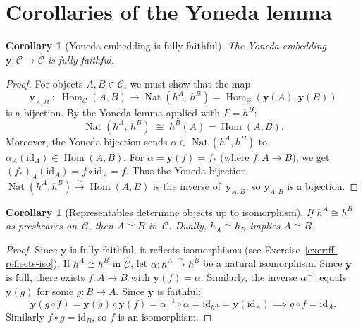 \documentclass[a4paper,12pt]{book}
\DeclareMathOperator{\Hom}{Hom}
\DeclareMathOperator{\Nat}{Nat}
\newcommand{\id}{\mathrm{id}}
\theoremstyle{definition}
\theoremstyle{plain}
\newtheorem{corollary}[definition]{Corollary}
\theoremstyle{remark}
\begin{document}
\section{Corollaries of the Yoneda lemma}\label{sec:yoneda-corollaries}

\begin{corollary}[Yoneda embedding is fully faithful]%
\label{cor:yoneda-ff}
The Yoneda embedding $\mathbf{y}\colon\mathcal{C}\to\widehat{\mathcal{C}}$
is fully faithful.
\end{corollary}

\begin{proof}
For objects $A,B\in\mathcal{C}$, we must show that the map
\[
    \mathbf{y}_{A,B} \;\colon\;
    \Hom_{\mathcal{C}}(A,B) \longrightarrow
    \Nat(h^A,\,h^B) = \Hom_{\widehat{\mathcal{C}}}(\mathbf{y}(A),\mathbf{y}(B))
\]
is a bijection.  By the Yoneda lemma applied with $F = h^B$:
\[
    \Nat(h^A,\,h^B) \;\cong\; h^B(A) = \Hom(A,B).
\]
Moreover, the Yoneda bijection sends $\alpha\in\Nat(h^A,h^B)$ to
$\alpha_A(\id_A)\in\Hom(A,B)$.  For $\alpha = \mathbf{y}(f) = f_*$
(where $f\colon A\to B$), we get $(f_*)_A(\id_A) = f\circ\id_A = f$.
Thus the Yoneda bijection $\Nat(h^A,h^B)\xrightarrow{\sim}\Hom(A,B)$
is the inverse of~$\mathbf{y}_{A,B}$, so $\mathbf{y}_{A,B}$ is
a bijection.
\end{proof}

\begin{corollary}[Representables determine objects up to isomorphism]%
\label{cor:representable-iso}
If $h^A \cong h^B$ as presheaves on~$\mathcal{C}$, then $A\cong B$
in~$\mathcal{C}$.  Dually, $h_A\cong h_B$ implies $A\cong B$.
\end{corollary}

\begin{proof}
Since $\mathbf{y}$ is fully faithful, it reflects isomorphisms
(see Exercise~\ref{exer:ff-reflects-iso}).
If $h^A\cong h^B$ in $\widehat{\mathcal{C}}$, let
$\alpha\colon h^A\xrightarrow{\sim} h^B$ be a natural isomorphism.
Since $\mathbf{y}$ is full, there exists $f\colon A\to B$ with
$\mathbf{y}(f)=\alpha$.  Similarly, the inverse $\alpha^{-1}$ equals
$\mathbf{y}(g)$ for some $g\colon B\to A$.  Since $\mathbf{y}$ is faithful:
\[
    \mathbf{y}(g\circ f) = \mathbf{y}(g)\circ\mathbf{y}(f)
    = \alpha^{-1}\circ\alpha = \id_{h^A} = \mathbf{y}(\id_A)
    \implies g\circ f = \id_A.
\]
Similarly $f\circ g = \id_B$, so $f$ is an isomorphism.
\end{proof}
\end{document}
